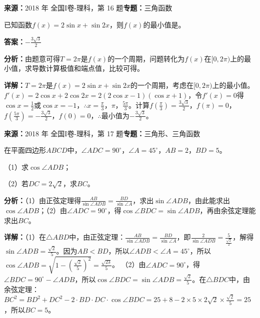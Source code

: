 \begin{question}[points=5]
\textbf{来源：}2018 年 全国I卷-理科，第 16 题\quad \textbf{专题：}三角函数\par
已知函数$f(x)=2\sin x+\sin 2x$，则$f(x)$的最小值是。
\begin{solution}
\textbf{答案：}$-\frac{3\sqrt{3}}{2}$

\textbf{分析：}由题意可得$T=2\pi$是$f(x)$的一个周期，问题转化为$f(x)$在$[0,2\pi)$上的最小值，求导数计算极值和端点值，比较可得。

\textbf{详解：}$T=2\pi$是$f(x)=2\sin x+\sin2x$的一个周期，考虑在$[0,2\pi)$上的最小值。$f'(x)=2\cos x+2\cos2x=2(2\cos x-1)(\cos x+1)$，令$f'(x)=0$得$\cos x=\frac{1}{2}$或$\cos x=-1$，$\therefore x=\frac{\pi}{3}$，$\pi$，$\frac{5\pi}{3}$。计算$f(\frac{\pi}{3})=\frac{3\sqrt{3}}{2}$，$f(\pi)=0$，$f(\frac{5\pi}{3})=-\frac{3\sqrt{3}}{2}$，$f(0)=0$，$\therefore$最小值为$-\frac{3\sqrt{3}}{2}$。
\end{solution}
\end{question}

\begin{question}[points=12]
\textbf{来源：}2018 年 全国I卷-理科，第 17 题\quad \textbf{专题：}三角形、三角函数\par
在平面四边形$ABCD$中，$\angle ADC=90^\circ$，$\angle A=45^\circ$，$AB=2$，$BD=5$。

（1）求$\cos\angle ADB$；

（2）若$DC=2\sqrt{2}$，求$BC$。
\begin{solution}

\textbf{分析：}（1）由正弦定理得$\frac{AB}{\sin\angle ADB}=\frac{BD}{\sin\angle A}$，求出$\sin\angle ADB$，由此能求出$\cos\angle ADB$；（2）由$\angle ADC=90^\circ$，得$\cos\angle BDC=\sin\angle ADB$，再由余弦定理能求出$BC$。

\textbf{详解：}（1）在$\triangle ABD$中，由正弦定理：$\frac{AB}{\sin\angle ADB}=\frac{BD}{\sin\angle A}$，即$\frac{2}{\sin\angle ADB}=\frac{5}{\frac{\sqrt{2}}{2}}$，解得$\sin\angle ADB=\frac{\sqrt{2}}{5}$。因为$AB<BD$，所以$\angle ADB<\angle A=45^\circ$，所以$\cos\angle ADB=\sqrt{1-(\frac{\sqrt{2}}{5})^2}=\frac{\sqrt{23}}{5}$。
（2）由$\angle ADC=90^\circ$，得$\angle BDC=90^\circ-\angle ADB$，所以$\cos\angle BDC=\sin\angle ADB=\frac{\sqrt{2}}{5}$。在$\triangle BDC$中，由余弦定理：$BC^2=BD^2+DC^2-2\cdot BD\cdot DC\cdot\cos\angle BDC=25+8-2\times5\times2\sqrt{2}\times\frac{\sqrt{2}}{5}=25$，所以$BC=5$。
\end{solution}
\end{question}


